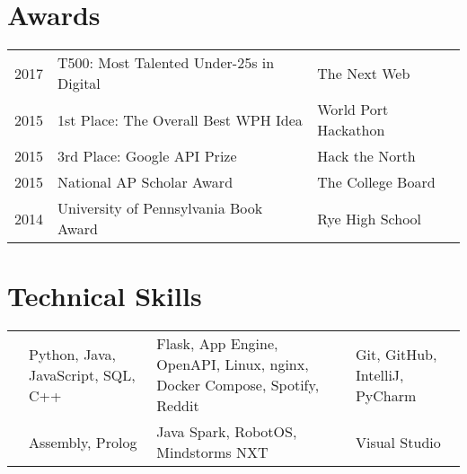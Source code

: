 \documentclass[]{deedy-resume-openfont}
\begin{document}
\begin{minipage}[t]{0.66\textwidth}
\section{Awards} 
\begin{tabular}{rll}
2017    & T500: Most Talented Under-25s in Digital  & The Next Web\\
2015    & 1st Place: The Overall Best WPH Idea      & World Port Hackathon\\
2015    & 3rd Place: Google API Prize               & Hack the North\\
2015    & National AP Scholar Award                 & The College Board\\
2014    & University of Pennsylvania Book Award     & Rye High School\\
\end{tabular}
\sectionsep


\section{Technical Skills}
\vspace{-\topsep}
\begin{tabulary}{\linewidth}{LLLL}
    &  &  &  \\
    \hline
     & Python, Java, JavaScript, SQL, C++ & Flask, App Engine, OpenAPI, Linux, nginx, Docker Compose, Spotify, Reddit  & Git, GitHub, IntelliJ, PyCharm \\
    \hline
     & Assembly, Prolog & Java Spark, RobotOS, Mindstorms NXT & Visual Studio \\
\end{tabulary} 

\end{minipage} 
\end{document}

